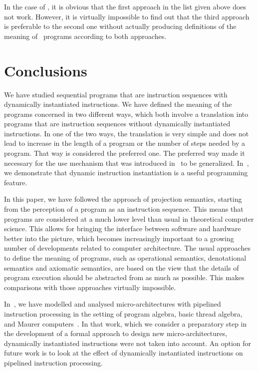 \documentclass[fleqn]{llncs}
\begin{document}
In the case of \PGLDdii, it is obvious that the first approach in the
list given above does not work.
However, it is virtually impossible to find out that the third approach
is preferable to the second one without actually producing definitions
of the meaning of \PGLDdii\ programs according to both approaches.

\section{Conclusions}
\label{sect-concl}

We have studied sequential programs that are instruction sequences with
dynamically instantiated instructions.
We have defined the meaning of the programs concerned in two different
ways, which both involve a translation into programs that are
instruction sequences without dynamically instantiated instructions.
In one of the two ways, the translation is very simple and does not lead
to increase in the length of a program or the number of steps needed by
a program.
That way is considered the preferred one.
The preferred way made it necessary for the use mechanism that was
introduced in~\cite{BM04c} to be generalized.
In~\cite{BM08a}, we demonstrate that dynamic instruction instantiation
is a useful programming feature.

In this paper, we have followed the approach of projection semantics,
starting from the perception of a program as an instruction sequence.
This means that programs are considered at a much lower level than usual
in theoretical computer science.
This allows for bringing the interface between software and hardware
better into the picture, which becomes increasingly important to a
growing number of developments related to computer architecture.
The usual approaches to define the meaning of programs, such as
operational semantics, denotational semantics and axiomatic semantics,
are based on the view that the details of program execution should be
abstracted from as much as possible.
This makes comparisons with those approaches virtually impossible.

In~\cite{BM06b}, we have modelled and analysed micro-architectures with
pipelined instruction processing in the setting of program algebra,
basic thread algebra, and Maurer computers~\cite{Mau66a,Mau06a}.
In that work, which we consider a preparatory step in the development of
a formal approach to design new micro-architectures, dynamically
instantiated instructions were not taken into account.
An option for future work is to look at the effect of dynamically
instantiated instructions on pipelined instruction processing.



\end{document}

